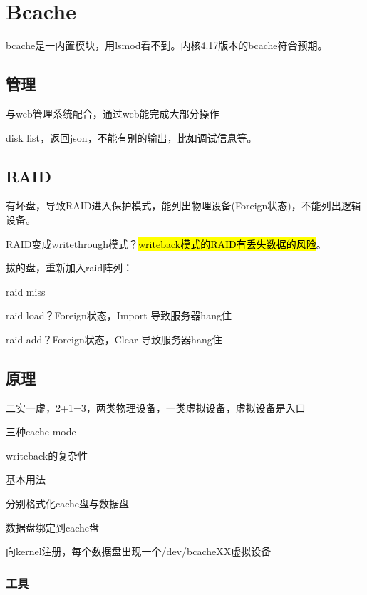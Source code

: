 \chapter{Bcache}

bcache是一内置模块，用lsmod看不到。内核4.17版本的bcache符合预期。

\section{管理}

与web管理系统配合，通过web能完成大部分操作

disk list，返回json，不能有别的输出，比如调试信息等。

\section{RAID}

有坏盘，导致RAID进入保护模式，能列出物理设备(Foreign状态)，不能列出逻辑设备。

RAID变成writethrough模式？\hl{writeback模式的RAID有丢失数据的风险}。

拔的盘，重新加入raid阵列：
\begin{enumbox}
\item raid miss
\item raid load？Foreign状态，Import 导致服务器hang住
\item raid add？Foreign状态，Clear 导致服务器hang住
\end{enumbox}

\section{原理}

二实一虚，2+1=3，两类物理设备，一类虚拟设备，虚拟设备是入口

三种cache mode

writeback的复杂性

基本用法
\begin{enumbox}
\item 分别格式化cache盘与数据盘
\item 数据盘绑定到cache盘
\item 向kernel注册，每个数据盘出现一个/dev/bcacheXX虚拟设备
\end{enumbox}

\subsection{工具}

